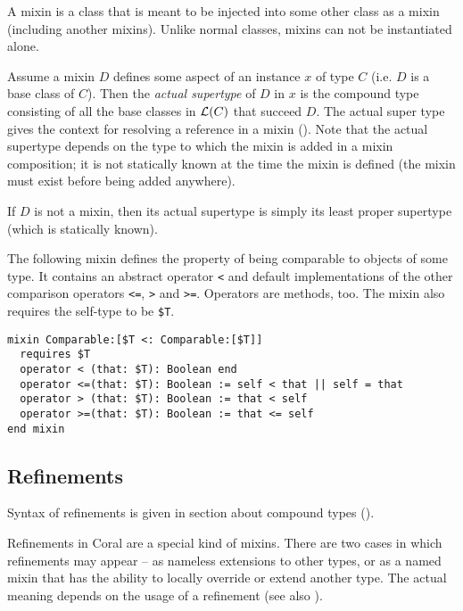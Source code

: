 A mixin is a class that is meant to be injected into some other class as a mixin (including another mixins). Unlike normal classes, mixins can not be instantiated alone. 

Assume a mixin $D$ defines some aspect of an instance $x$ of type $C$ (i.e. $D$ is a base class of $C$). Then the {\em actual supertype} of $D$ in $x$ is the compound type consisting of all the base classes in ${\cal L}(C)$ that succeed $D$. The actual super type gives the context for resolving a  reference in a mixin (). Note that the actual supertype depends on the type to which the mixin is added in a mixin composition; it is not statically known at the time the mixin is defined (the mixin must exist before being added anywhere). 

If $D$ is not a mixin, then its actual supertype is simply its least proper supertype (which is statically known). 

\example The following mixin defines the property of being comparable to objects of some type. It contains an abstract operator \lstinline!<! and default implementations of the other comparison operators \lstinline!<=!, \lstinline!>! and \lstinline!>=!. Operators are methods, too. The mixin also requires the self-type to be \lstinline[mathescape=false]!$T!. 
\begin{lstlisting}[mathescape=false]
mixin Comparable:[$T <: Comparable:[$T]]
  requires $T
  operator < (that: $T): Boolean end
  operator <=(that: $T): Boolean := self < that || self = that
  operator > (that: $T): Boolean := that < self
  operator >=(that: $T): Boolean := that <= self
end mixin
\end{lstlisting}

\subsection{Refinements}
\label{sec:refinements}

Syntax of refinements is given in section about compound types (). 

Refinements in Coral are a special kind of mixins. There are two cases in which refinements may appear -- as nameless extensions to other types, or as a named mixin that has the ability to locally override or extend another type. The actual meaning depends on the usage of a refinement (see also ).


